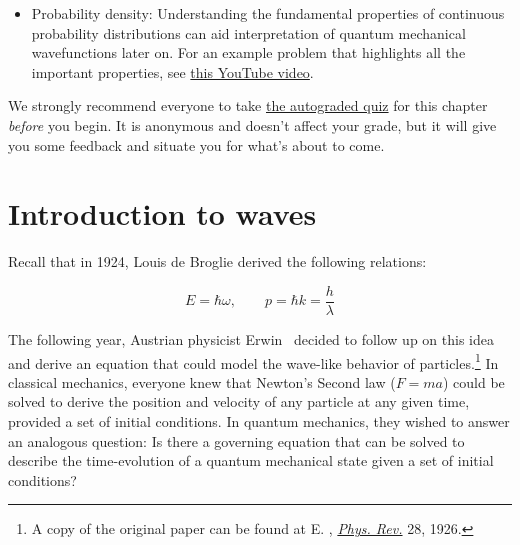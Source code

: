 \begin{itemize}
	\item Probability density: Understanding the fundamental properties of continuous probability distributions can aid interpretation of quantum mechanical wavefunctions later on.
	For an example problem that highlights all the important properties, see \href{https://www.youtube.com/watch?v=QKA4HNEw3aY}{this YouTube video}.
\end{itemize}

\begin{tcolorbox}[colframe=PaloAlto, colbacktitle=PaloAlto!20!white, title=Self-check quiz]
	We strongly recommend everyone to take \href{https://forms.gle/3HcR81RWdTTRJXzGA}{the autograded quiz} for this chapter \emph{before} you begin.
	It is anonymous and doesn't affect your grade, but it will give you some feedback and situate you for what's about to come.
\end{tcolorbox}


\section{Introduction to waves}

Recall that in 1924, Louis de Broglie derived the following relations:

\begin{tcolorbox}[title=de Broglie relations] \vspace{-2ex}
	\begin{equation*}
		E=\hbar\omega, \qquad p = \hbar k = \frac{h}{\lambda}
	\end{equation*}
\end{tcolorbox}

The following year, Austrian physicist Erwin \Sch\ decided to follow up on this idea and derive an equation that could model the wave-like behavior of particles.\footnote{A copy of the original paper can be found at E. \Sch, \href{https://journals.aps.org/pr/abstract/10.1103/PhysRev.28.1049}{\emph{Phys. Rev.}} 28, 1926.} 
In classical mechanics, everyone knew that Newton's Second law ($F=ma$) could be solved to derive the position and velocity of any particle at any given time, provided a set of initial conditions. 
In quantum mechanics, they wished to answer an analogous question: Is there a governing equation that can be solved to describe the time-evolution of a quantum mechanical state given a set of initial conditions? 

